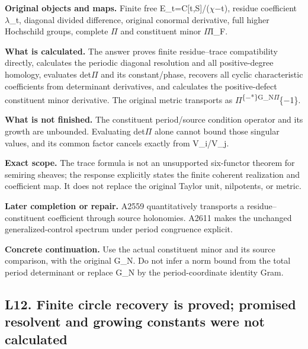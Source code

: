 \documentclass[10pt,a4paper,oneside]{report}
\begin{document}
\textbf{Original objects and maps.} Finite free
E\_t=C[t,S]/(\allowbreak{}\ensuremath{χ}\allowbreak{}\allowbreak{}\ensuremath{−}\allowbreak{}t),
residue coefficient \allowbreak{}\ensuremath{λ}\allowbreak{}\_t,
diagonal divided difference, original conormal derivative, full higher
Hochschild groups, complete \allowbreak{}\ensuremath{Π}\allowbreak{} and
constituent minor \allowbreak{}\ensuremath{Π}\allowbreak{}I\_F.

\textbf{What is calculated.} The answer proves finite residue--trace
compatibility directly, calculates the periodic diagonal resolution and
all positive-degree homology, evaluates
det\allowbreak{}\ensuremath{Π}\allowbreak{} and its constant/phase,
recovers all cyclic characteristic coefficients from determinant
derivatives, and calculates the positive-defect constituent minor
derivative. The original metric transports as
\allowbreak{}\ensuremath{Π}\allowbreak{}\textsuperscript{\{\allowbreak{}\ensuremath{−}\allowbreak{}*\}G\_N\allowbreak{}\ensuremath{Π}\allowbreak{}}\{\allowbreak{}\ensuremath{−}\allowbreak{}1\}.

\textbf{What is not finished.} The constituent period/source condition
operator and its growth are unbounded. Evaluating
det\allowbreak{}\ensuremath{Π}\allowbreak{} alone cannot bound those
singular values, and its common factor cancels exactly from V\_i/V\_j.

\textbf{Exact scope.} The trace formula is not an unsupported
six-functor theorem for semiring sheaves; the response explicitly states
the finite coherent realization and coefficient map. It does not replace
the original Taylor unit, nilpotents, or metric.

\textbf{Later completion or repair.} A2559 quantitatively transports a
residue--constituent coefficient through source holonomies. A2611 makes
the unchanged generalized-control spectrum under period congruence
explicit.

\textbf{Concrete continuation.} Use the actual constituent minor and its
source comparison, with the original G\_N. Do not infer a norm bound
from the total period determinant or replace G\_N by the
period-coordinate identity Gram.

\subsection{L12. Finite circle recovery is proved; promised resolvent
and growing constants were not
calculated}\label{l12.-finite-circle-recovery-is-proved-promised-resolvent-and-growing-constants-were-not-calculated}
\end{document}
